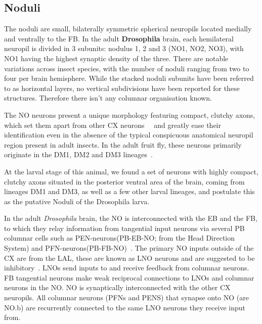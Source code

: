
\subsection*{Noduli}

The noduli are small, bilaterally symmetric spherical neuropils located medially and ventrally to the FB. In the adult \textbf{Drosophila} brain, each hemilateral neuropil is divided in 3 subunits: nodulus 1, 2 and 3 (NO1, NO2, NO3), with NO1 having the highest synaptic density of the three. There are notable variations across insect species, with the number of noduli ranging from two to four per brain hemisphere.
While the stacked noduli subunits have been referred to as horizontal layers, no vertical subdivisions have been reported for these structures. Therefore there isn't any columnar organisation known.


The NO neurons present a unique morphology featuring compact, clutchy axons, which set them apart from other CX neurons~\citep{wolff2018neuroarchitecture}~\citep{hulse2021connectome} and greatly ease their identification even in the absence of the typical conspicuous anatomical neuropil region present in adult insects. In the adult fruit fly, these neurons primarily originate in the DM1, DM2 and DM3 lineages~\citep{andrade2019developmentally}.


At the larval stage of this animal, we found a set of neurons with highly compact, clutchy axons situated in the posterior ventral area of the brain, coming from lineages DM1 and DM3, as well as a few other larval lineages, and postulate this as the putative Noduli of the Drosophila larva. 

In the adult \textit{Drosophila} brain, the NO is  interconnected with the EB and the FB, to which they relay information from tangential input neurons via several PB columnar cells such as PEN-neurons(PB-EB-NO; from the Head Direction System) and PFN-neurons(PB-FB-NO)~\citep{wolff2015neuroarchitecture, hulse2021connectome}. The primary NO inputs outside of the CX are from the LAL, these are known as LNO neurons and are suggested to be inhibitory~\citep{wolff2018neuroarchitecture,hulse2021connectome}. LNOs send inputs to and receive feedback from columnar neurons. %
FB tangential neurons make weak reciprocal connections to LNOs and columnar neurons in the NO.
NO is synaptically interconnected with the other CX neuropils. All columnar neurons (PFNs and PENS) that synapse onto NO (are NO.b) are recurrently connected to the same LNO neurons they receive input from. 

